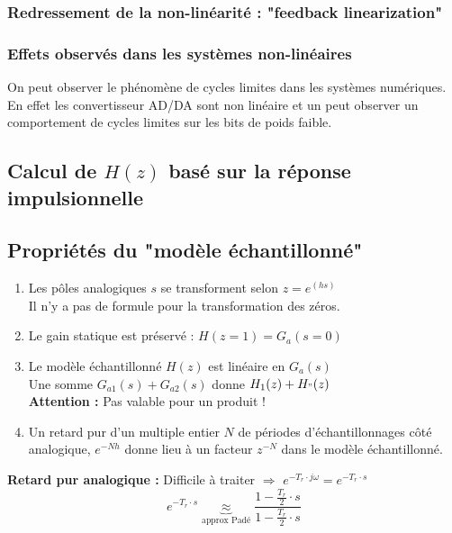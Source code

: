 \documentclass[document.tex]{subfiles}
\begin{document}

\subsubsection{Redressement de la non-linéarité : "feedback linearization"}


\subsubsection{Effets observés dans les systèmes non-linéaires}



On peut observer le phénomène de cycles limites dans les systèmes numériques. En effet les convertisseur AD/DA sont non linéaire et un peut observer un comportement de cycles limites sur les bits de poids faible.

\subsection{Calcul de $H(z)$ basé sur la réponse impulsionnelle}


\subsection{Propriétés du "modèle échantillonné"}

\begin{enumerate}
\item Les pôles analogiques $𝑠$ se transforment selon $z= e^(h s)$\\
Il n'y a pas de formule pour la transformation des zéros.
\item Le gain statique est préservé : $H(z=1)  =  G_a (s=0)$
\item Le modèle échantillonné $H(z)$ est linéaire en $G_a(s)$ \\
Une somme $G_{a1} (s) + G_{a2}(s)$ donne $H_1(z) + H_"(z)$\\
\textbf{Attention :} Pas valable pour un produit !
\item Un retard pur d'un multiple entier $N$ de périodes d'échantillonnages côté analogique, $e^{-N h}$ donne lieu à un facteur $z^{-N}$ dans le modèle échantillonné.
\end{enumerate}

\textbf{Retard pur analogique : } Difficile à traiter $\Rightarrow$ $\boxed{e^{-T_r \cdot j \omega}=e^{-T_r \cdot s}}$
$$
e^{-T_r \cdot s} \underbrace{\approx}_{\text{approx Padé}} \dfrac{1-\frac{T_r}{2}\cdot s}{1-\frac{T_r}{2}\cdot s}
$$
\end{document}
